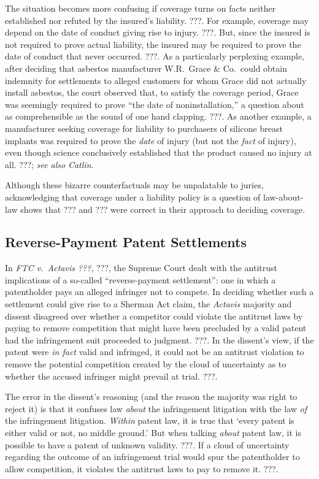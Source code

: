 \documentclass[
  12pt,
  letterpaper,
]{scrartcl}
\begin{document}
The situation becomes more confusing if coverage turns on facts neither
established nor refuted by the insured's liability. ???. For example, coverage
may depend on the date of conduct giving rise to injury. ???. But, since the
insured is not required to prove actual liability, the insured may be required
to prove the date of conduct that never occurred. ???. As a particularly
perplexing example, after deciding that asbestos manufacturer W.R.~Grace \&
Co.~could obtain indemnity for settlements to alleged customers for whom Grace
did not actually install asbestos, the court observed that, to satisfy the
coverage period, Grace was seemingly required to prove ``the date of
noninstallation,'' a question about as comprehensible as the sound of one hand
clapping. ???. As another example, a manufacturer seeking coverage for
liability to purchasers of silicone breast implants was required to prove the
\emph{date} of injury (but not the \emph{fact} of injury), even though science
conclusively established that the product caused no injury at all. ???;
\textit{see also} \textit{Catlin}.

Although these bizarre counterfactuals may be unpalatable to juries,
acknowledging that coverage under a liability policy is a question of
law-about-law shows that ??? and ??? were correct in their approach to deciding
coverage.


\subsection{Reverse-Payment Patent Settlements}

In \textit{FTC v.~Actavis ???}, ???, the Supreme Court dealt with the antitrust
implications of a so-called ``reverse-payment settlement'': one in which a
patentholder pays an alleged infringer not to compete. In deciding whether such
a settlement could give rise to a Sherman Act claim, the \textit{Actavis}
majority and dissent disagreed over whether a competitor could violate the
antitrust laws by paying to remove competition that might have been precluded
by a valid patent had the infringement suit proceeded to judgment. ???. In the
dissent's view, if the patent were \emph{in fact} valid and infringed, it could
not be an antitrust violation to remove the potential competition created by
the cloud of uncertainty as to whether the accused infringer might prevail at
trial. ???.

The error in the dissent's reasoning (and the reason the majority was right to
reject it) is that it confuses law \textit{about} the infringement litigation 
with the law \textit{of} the infringement litigation. \textit{Within}
patent law, it is true that `every patent is either valid or not, no middle
ground.' But when talking \textit{about} patent law, it is possible to have a
patent of unknown validity. ???. If a cloud of uncertainty regarding the
outcome of an infringement trial would spur the patentholder to allow
competition, it violates the antitrust laws to pay to remove it. ???.
\end{document}
